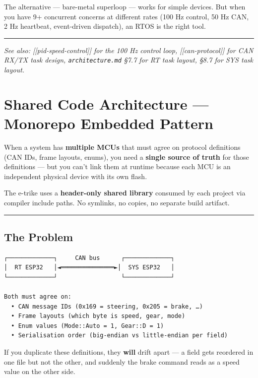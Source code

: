 \documentclass[12pt,a4paper,oneside]{report}
\begin{document}
The alternative --- bare-metal superloop --- works for simple devices. But when
you have 9+ concurrent concerns at different rates (100 Hz control, 50 Hz CAN, 2
Hz heartbeat, event-driven dispatch), an RTOS is the right tool.

\begin{center}\rule{0.5\linewidth}{0.5pt}\end{center}

\emph{See also: {[}{[}pid-speed-control{]}{]} for the 100 Hz control loop,
{[}{[}can-protocol{]}{]} for CAN RX/TX task design, \texttt{architecture.md}
§7.7 for RT task layout, §8.7 for SYS task layout.}


\chapter{Shared Code Architecture --- Monorepo Embedded
Pattern}\label{shared-code-architecture-monorepo-embedded-pattern}

When a system has \textbf{multiple MCUs} that must agree on protocol definitions
(CAN IDs, frame layouts, enums), you need a \textbf{single source of truth} for
those definitions --- but you can't link them at runtime because each MCU is an
independent physical device with its own flash.

The e-trike uses a \textbf{header-only shared library} consumed by each project
via compiler include paths. No symlinks, no copies, no separate build artifact.

\begin{center}\rule{0.5\linewidth}{0.5pt}\end{center}

\section{The Problem}\label{the-problem}

\begin{verbatim}
┌─────────────┐     CAN bus      ┌─────────────┐
│  RT ESP32   │◄═══════════════►│  SYS ESP32   │
└─────────────┘                  └─────────────┘

Both must agree on:
  • CAN message IDs (0x169 = steering, 0x205 = brake, …)
  • Frame layouts (which byte is speed, gear, mode)
  • Enum values (Mode::Auto = 1, Gear::D = 1)
  • Serialisation order (big-endian vs little-endian per field)
\end{verbatim}

If you duplicate these definitions, they \textbf{will} drift apart --- a field
gets reordered in one file but not the other, and suddenly the brake command
reads as a speed value on the other side.
\end{document}
